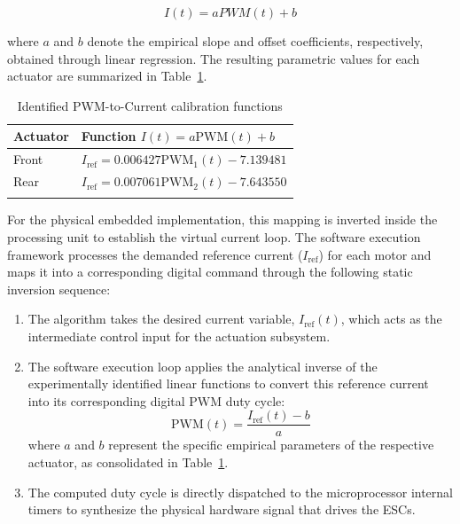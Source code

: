 \documentclass[pdflatex,sn-mathphys-num,iicol]{sn-jnl}
\theoremstyle{thmstyleone}%
\theoremstyle{thmstyletwo}%
\theoremstyle{thmstylethree}%
\begin{document}
\begin{equation}
I(t) = a PWM(t) + b
\label{eq:pwm_current_linear}
\end{equation}

\noindent where $a$ and $b$ denote the empirical slope and offset coefficients, respectively, obtained through linear regression. The resulting parametric values for each actuator are summarized in Table~\ref{tab:current_parameters}.

\begin{table}[h]
\caption{Identified PWM-to-Current calibration functions}\label{tab:current_parameters}%
\begin{center}
\begin{minipage}{\columnwidth}
\setlength{\tabcolsep}{6pt} %
\footnotesize %
\begin{tabular*}{\columnwidth}{@{}ll@{}}
\toprule
Actuator &  Function $I(t) = a \text{PWM}(t) + b$ \\
\midrule
Front & $I_{\text{ref}} = 0.006427 \text{PWM}_1(t) - 7.139481$ \\
Rear  & $I_{\text{ref}} = 0.007061 \text{PWM}_2(t) - 7.643550$ \\
\botrule
\end{tabular*}
\end{minipage}
\end{center}
\end{table}

For the physical embedded implementation, this mapping is inverted inside the processing unit to establish the virtual current loop. The software execution framework processes the demanded reference current ($I_{\text{ref}}$) for each motor and maps it into a corresponding digital command through the following static inversion sequence:

\begin{enumerate}
    \item The algorithm takes the desired current variable, $I_{\text{ref}}(t)$, which acts as the intermediate control input for the actuation subsystem.
    \item The software execution loop applies the analytical inverse of the experimentally identified linear functions to convert this reference current into its corresponding digital $\text{PWM}$ duty cycle:
    \begin{equation}
    \text{PWM}(t) = \frac{I_{\text{ref}}(t) - b}{a}
    \label{eq:inverse_pwm}
    \end{equation}
    \noindent where $a$ and $b$ represent the specific empirical parameters of the respective actuator, as consolidated in Table~\ref{tab:current_parameters}.
    \item The computed duty cycle is directly dispatched to the microprocessor internal timers to synthesize the physical hardware signal that drives the ESCs.
\end{enumerate}
\end{document}
